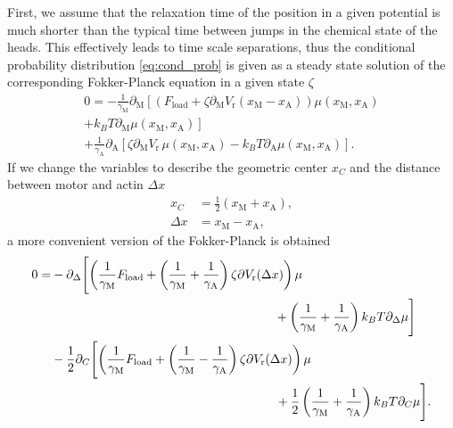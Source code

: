 \documentclass[aps,pre,twocolumn,showpacs,showkeys,superscriptaddress,floatfix]{revtex4-1}
\begin{document}
First, we assume that the relaxation time of the position in a given potential is much shorter than the typical time between jumps in the chemical state of the heads. 
This effectively leads to time scale separations,
thus the conditional probability distribution \eqref{eq:cond_prob} is given as a steady state solution of the corresponding Fokker-Planck equation in a given state $\zeta$
\begin{multline*}
0 = - \frac{1}{\gamma_\text{M}} \partial_\text{M} \left[ \left( F_\text{load} + \zeta \partial_\text{M} V_\text{r}( x_\text{M} - x_\text{A} ) \right) \mu\left( x_\text{M}, x_\text{A} \right)
\right. \\ \left.
+ k_B T \partial_\text{M} \mu\left( x_\text{M}, x_\text{A} \right) \right] 
\\
+ \frac{1}{\gamma_\text{A}} \partial_\text{A} \left[ 
\zeta \partial_\text{M} V_\text{r} \, \mu( x_\text{M}, x_\text{A} ) 
- k_B T \partial_\text{A} \mu\left( x_\text{M}, x_\text{A} \right) 
\right] .
\end{multline*}
If we change the variables to describe the geometric center $x_C$ and the distance between motor and actin $\Delta x$
\begin{align*}
x_C &= \frac{1}{2} ( x_\text{M} + x_\text{A} ) , \\
\Delta x &= x_\text{M} - x_\text{A}, 
\end{align*}
a more convenient version of the Fokker-Planck is obtained
\begin{align*}
0 =& \begin{multlined}[t][.85\linewidth]
- \partial_\Delta \Biggl[ 
\left( \frac{1}{\gamma_\text{M}} F_\text{load} + \left( \frac{1}{\gamma_\text{M}} + \frac{1}{\gamma_\text{A}} \right) \zeta \partial V_\text{r}( \Delta x ) \right) \mu
\\ 
+ \left( \frac{1}{\gamma_\text{M}} + \frac{1}{\gamma_\text{A}} \right) k_B T \partial_\Delta \mu 
\Biggr] 
\end{multlined}
\\
&- \begin{multlined}[t][.85\linewidth]
\frac{1}{2} \partial_C \Biggl[
\left( \frac{1}{\gamma_\text{M}} F_\text{load} + \left( \frac{1}{\gamma_\text{M}} - \frac{1}{\gamma_\text{A}} \right) \zeta \partial V_\text{r}( \Delta x ) \right) \mu
\\
+ \frac{1}{2} \left( \frac{1}{\gamma_\text{M}} + \frac{1}{\gamma_\text{A}} \right) k_B T \partial_C \mu 
\Biggr] .
\end{multlined}
\end{align*}
\end{document}
